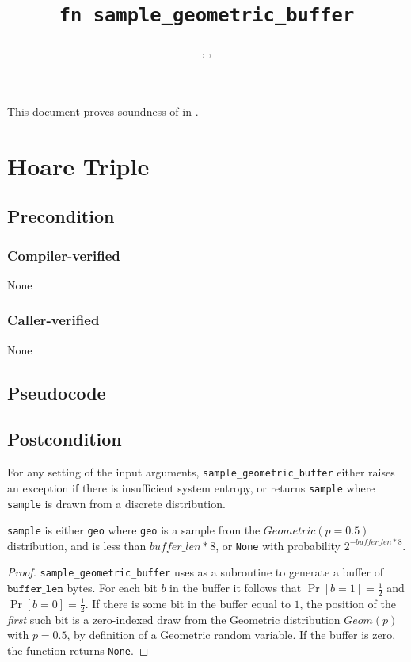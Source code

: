 \documentclass{article}
\title{\texttt{fn sample\_geometric\_buffer}}
\author{\VickiXuAuthor, \HanwenZhangAuthor, \ZacharyRatliffAuthor}
\begin{document}
\maketitle
\contrib

This document proves soundness of  in .

\section{Hoare Triple}
\subsection*{Precondition}
\subsubsection*{Compiler-verified}
None

\subsubsection*{Caller-verified}
None

\subsection*{Pseudocode}


\subsection*{Postcondition}
\begin{theorem}
For any setting of the input arguments, \texttt{sample\_geometric\_buffer} either
raises an exception if there is insufficient system entropy,
or returns \texttt{sample} where \texttt{sample} is drawn from a discrete distribution.

\texttt{sample} is either
\texttt{geo} where \texttt{geo} is a sample from the $Geometric(p=0.5)$ distribution, and is less than $buffer\_len * 8$, or
\texttt{None} with probability $2^{-buffer\_len * 8}$.
\end{theorem}

\begin{proof}
    \texttt{sample\_geometric\_buffer} uses  as a subroutine to generate a buffer of $\texttt{buffer\_len}$ bytes.
    For each bit $b$ in the buffer it follows that $\Pr[b = 1] = \frac{1}{2}$ and $\Pr[b = 0] = \frac{1}{2}$.
    If there is some bit in the buffer equal to $1$,
    the position of the \emph{first} such bit is a zero-indexed draw from the Geometric distribution $Geom(p)$ with $p = 0.5$,
    by definition of a Geometric random variable.
    If the buffer is zero, the function returns \texttt{None}.
\end{proof}
\end{document}
